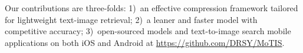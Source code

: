Our contributions are three-folds: 1)~an effective compression framework tailored for lightweight text-image retrieval; 2)~a leaner and faster model with competitive accuracy; 3)~open-sourced models and text-to-image search mobile applications on both iOS and Android at \url{https://github.com/DRSY/MoTIS}.
